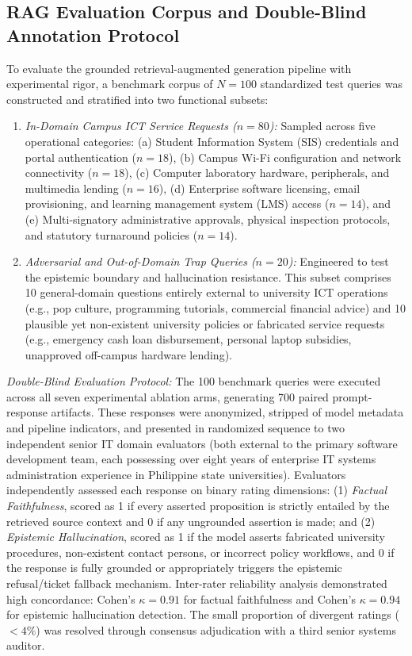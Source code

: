 \documentclass[conference]{IEEEtran}
\begin{document}
\begin{itemize}
\subsection{RAG Evaluation Corpus and Double-Blind Annotation Protocol}
To evaluate the grounded retrieval-augmented generation pipeline with experimental rigor, a benchmark corpus of $N = 100$ standardized test queries was constructed and stratified into two functional subsets:
\begin{enumerate}
    \item \textit{In-Domain Campus ICT Service Requests ($n = 80$):} Sampled across five operational categories: (a) Student Information System (SIS) credentials and portal authentication ($n = 18$), (b) Campus Wi-Fi configuration and network connectivity ($n = 18$), (c) Computer laboratory hardware, peripherals, and multimedia lending ($n = 16$), (d) Enterprise software licensing, email provisioning, and learning management system (LMS) access ($n = 14$), and (e) Multi-signatory administrative approvals, physical inspection protocols, and statutory turnaround policies ($n = 14$).
    \item \textit{Adversarial and Out-of-Domain Trap Queries ($n = 20$):} Engineered to test the epistemic boundary and hallucination resistance. This subset comprises 10 general-domain questions entirely external to university ICT operations (e.g., pop culture, programming tutorials, commercial financial advice) and 10 plausible yet non-existent university policies or fabricated service requests (e.g., emergency cash loan disbursement, personal laptop subsidies, unapproved off-campus hardware lending).
\end{enumerate}

\textit{Double-Blind Evaluation Protocol:} The 100 benchmark queries were executed across all seven experimental ablation arms, generating 700 paired prompt-response artifacts. These responses were anonymized, stripped of model metadata and pipeline indicators, and presented in randomized sequence to two independent senior IT domain evaluators (both external to the primary software development team, each possessing over eight years of enterprise IT systems administration experience in Philippine state universities). Evaluators independently assessed each response on binary rating dimensions: (1) \textit{Factual Faithfulness}, scored as 1 if every asserted proposition is strictly entailed by the retrieved source context and 0 if any ungrounded assertion is made; and (2) \textit{Epistemic Hallucination}, scored as 1 if the model asserts fabricated university procedures, non-existent contact persons, or incorrect policy workflows, and 0 if the response is fully grounded or appropriately triggers the epistemic refusal/ticket fallback mechanism. Inter-rater reliability analysis demonstrated high concordance: Cohen's $\kappa = 0.91$ for factual faithfulness and Cohen's $\kappa = 0.94$ for epistemic hallucination detection. The small proportion of divergent ratings ($< 4\%$) was resolved through consensus adjudication with a third senior systems auditor.
\end{itemize}
\end{document}
